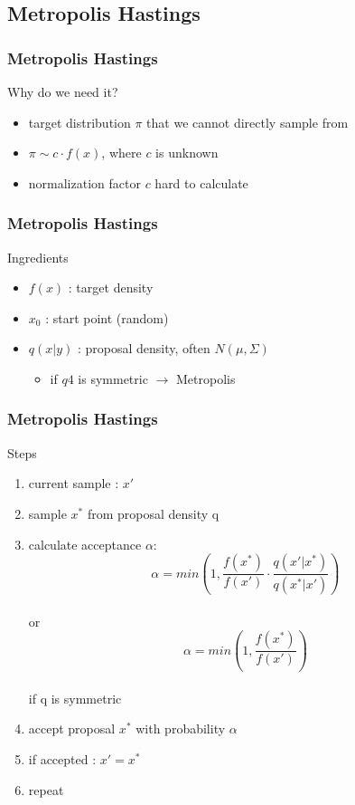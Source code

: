 \subsection{Metropolis Hastings}
\begin{frame}
\frametitle{Metropolis Hastings}

\begin{block}{Why do we need it?}
\begin{itemize}
\item target distribution $\pi$ that we cannot directly sample from
\item $\pi \sim c \cdot f(x)$, where $c$ is unknown
\item normalization factor $c$ hard to calculate
\end{itemize}
\end{block}

\end{frame}


\begin{frame}
\frametitle{Metropolis Hastings}


\begin{block}{Ingredients}
\begin{itemize}
\item $f(x)$ : target density
\item $x_0$ : start point (random)
\item $q(x|y)$ : proposal density, often $N(\mu, \Sigma)$ \\
\begin{itemize}
	\item if $q4$ is symmetric $\rightarrow$ Metropolis
\end{itemize}
\end{itemize}
\end{block}

\end{frame}

\begin{frame}
\frametitle{Metropolis Hastings}

\begin{block}{Steps}
\begin{enumerate}
  \item current sample : $x'$
\item sample $x^*$ from proposal density q
\item calculate acceptance $\alpha$:
\[\alpha = min\left(1, \frac{f(x^*)}{f(x')} \cdot
\frac{q(x'|x^*)}{q(x^*|x')} \right)\]\\
or\\
\[\alpha = min\left(1, \frac{f(x^*)}{f(x')}\right)\]\\ 
if q is symmetric

\item accept proposal $x^*$ with probability $\alpha$
\item if accepted : $x' = x^*$
\item repeat
\end{enumerate}
\end{block}
\end{frame}


